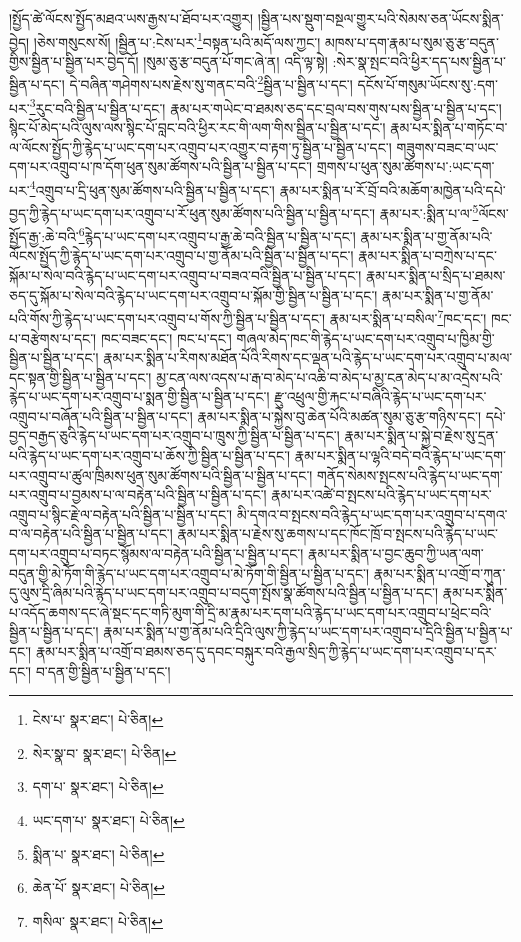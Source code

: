 །སྤྱོད་ཚེ་ལོངས་སྤྱོད་མཐའ་ཡས་རྒྱས་པ་ཐོབ་པར་འགྱུར། །སྦྱིན་པས་སྡུག་བསྔལ་གྱུར་པའི་སེམས་ཅན་ཡོངས་སྨིན་བྱེད། །ཅེས་གསུངས་སོ། །སྦྱིན་པ་:ངེས་པར་\footnote{ངེས་པ་  སྣར་ཐང་།  པེ་ཅིན། }བསྟན་པའི་མདོ་ལས་ཀྱང་། མཁས་པ་དག་རྣམ་པ་སུམ་ཅུ་རྩ་བདུན་གྱིས་སྦྱིན་པ་སྦྱིན་པར་བྱེད་དོ། །སུམ་ཅུ་རྩ་བདུན་པོ་གང་ཞེ་ན། འདི་ལྟ་སྟེ། :སེར་སྣ་སྤང་བའི་ཕྱིར་དད་པས་སྦྱིན་པ་སྦྱིན་པ་དང་། དེ་བཞིན་གཤེགས་པས་རྗེས་སུ་གནང་བའི་\footnote{སེར་སྣ་བ་  སྣར་ཐང་།  པེ་ཅིན། }སྦྱིན་པ་སྦྱིན་པ་དང་། དངོས་པོ་གསུམ་ཡོངས་སུ་:དག་པར་\footnote{དག་པ་  སྣར་ཐང་།  པེ་ཅིན། }རུང་བའི་སྦྱིན་པ་སྦྱིན་པ་དང་། རྣམ་པར་གཡེང་བ་ཐམས་ཅད་དང་བྲལ་བས་གུས་པས་སྦྱིན་པ་སྦྱིན་པ་དང་། སྙིང་པོ་མེད་པའི་ལུས་ལས་སྙིང་པོ་བླང་བའི་ཕྱིར་རང་གི་ལག་གིས་སྦྱིན་པ་སྦྱིན་པ་དང་། རྣམ་པར་སྨིན་པ་གཏོང་བ་ལ་ལོངས་སྤྱོད་ཀྱི་རྙེད་པ་ཡང་དག་པར་འགྲུབ་པར་འགྱུར་བ་རྟག་ཏུ་སྦྱིན་པ་སྦྱིན་པ་དང་། གཟུགས་བཟང་བ་ཡང་དག་པར་འགྲུབ་པ་ཁ་དོག་ཕུན་སུམ་ཚོགས་པའི་སྦྱིན་པ་སྦྱིན་པ་དང་། གྲགས་པ་ཕུན་སུམ་ཚོགས་པ་:ཡང་དག་པར་\footnote{ཡང་དག་པ་  སྣར་ཐང་།  པེ་ཅིན། }འགྲུབ་པ་དྲི་ཕུན་སུམ་ཚོགས་པའི་སྦྱིན་པ་སྦྱིན་པ་དང་། རྣམ་པར་སྨིན་པ་རོ་བྲོ་བའི་མཆོག་མཁྱེན་པའི་དཔེ་བྱད་ཀྱི་རྙེད་པ་ཡང་དག་པར་འགྲུབ་པ་རོ་ཕུན་སུམ་ཚོགས་པའི་སྦྱིན་པ་སྦྱིན་པ་དང་། རྣམ་པར་:སྨིན་པ་ལ་\footnote{སྨིན་པ་  སྣར་ཐང་།  པེ་ཅིན། }ལོངས་སྤྱོད་རྒྱ་:ཆེ་བའི་\footnote{ཆེན་པོ་  སྣར་ཐང་།  པེ་ཅིན། }རྙེད་པ་ཡང་དག་པར་འགྲུབ་པ་རྒྱ་ཆེ་བའི་སྦྱིན་པ་སྦྱིན་པ་དང་། རྣམ་པར་སྨིན་པ་གྱ་ནོམ་པའི་ལོངས་སྤྱོད་ཀྱི་རྙེད་པ་ཡང་དག་པར་འགྲུབ་པ་གྱ་ནོམ་པའི་སྦྱིན་པ་སྦྱིན་པ་དང་། རྣམ་པར་སྨིན་པ་བཀྲེས་པ་དང་སྐོམ་པ་སེལ་བའི་རྙེད་པ་ཡང་དག་པར་འགྲུབ་པ་བཟའ་བའི་སྦྱིན་པ་སྦྱིན་པ་དང་། རྣམ་པར་སྨིན་པ་སྲིད་པ་ཐམས་ཅད་དུ་སྐོམ་པ་སེལ་བའི་རྙེད་པ་ཡང་དག་པར་འགྲུབ་པ་སྐོམ་གྱི་སྦྱིན་པ་སྦྱིན་པ་དང་། རྣམ་པར་སྨིན་པ་གྱ་ནོམ་པའི་གོས་ཀྱི་རྙེད་པ་ཡང་དག་པར་འགྲུབ་པ་གོས་ཀྱི་སྦྱིན་པ་སྦྱིན་པ་དང་། རྣམ་པར་སྨིན་པ་བསིལ་\footnote{གསིལ་  སྣར་ཐང་།  པེ་ཅིན། }ཁང་དང་། ཁང་པ་བརྩེགས་པ་དང་། ཁང་བཟང་དང་། ཁང་པ་དང་། གཞལ་མེད་ཁང་གི་རྙེད་པ་ཡང་དག་པར་འགྲུབ་པ་ཁྱིམ་གྱི་སྦྱིན་པ་སྦྱིན་པ་དང་། རྣམ་པར་སྨིན་པ་རིགས་མཐོན་པོའི་རིགས་དང་ལྡན་པའི་རྙེད་པ་ཡང་དག་པར་འགྲུབ་པ་མལ་དང་སྟན་གྱི་སྦྱིན་པ་སྦྱིན་པ་དང་། མྱ་ངན་ལས་འདས་པ་རྒ་བ་མེད་པ་འཆི་བ་མེད་པ་མྱ་ངན་མེད་པ་མ་འདྲེས་པའི་རྙེད་པ་ཡང་དག་པར་འགྲུབ་པ་སྨན་གྱི་སྦྱིན་པ་སྦྱིན་པ་དང་། རྫུ་འཕྲུལ་གྱི་རྐང་པ་བཞིའི་རྙེད་པ་ཡང་དག་པར་འགྲུབ་པ་བཞོན་པའི་སྦྱིན་པ་སྦྱིན་པ་དང་། རྣམ་པར་སྨིན་པ་སྐྱེས་བུ་ཆེན་པོའི་མཚན་སུམ་ཅུ་རྩ་གཉིས་དང་། དཔེ་བྱད་བརྒྱད་ཅུའི་རྙེད་པ་ཡང་དག་པར་འགྲུབ་པ་ཁྲུས་ཀྱི་སྦྱིན་པ་སྦྱིན་པ་དང་། རྣམ་པར་སྨིན་པ་སྐྱེ་བ་རྗེས་སུ་དྲན་པའི་རྙེད་པ་ཡང་དག་པར་འགྲུབ་པ་ཆོས་ཀྱི་སྦྱིན་པ་སྦྱིན་པ་དང་། རྣམ་པར་སྨིན་པ་ལྷའི་བདེ་བའི་རྙེད་པ་ཡང་དག་པར་འགྲུབ་པ་ཚུལ་ཁྲིམས་ཕུན་སུམ་ཚོགས་པའི་སྦྱིན་པ་སྦྱིན་པ་དང་། གནོད་སེམས་སྤངས་པའི་རྙེད་པ་ཡང་དག་པར་འགྲུབ་པ་བྱམས་པ་ལ་བརྟེན་པའི་སྦྱིན་པ་སྦྱིན་པ་དང་། རྣམ་པར་འཚེ་བ་སྤངས་པའི་རྙེད་པ་ཡང་དག་པར་འགྲུབ་པ་སྙིང་རྗེ་ལ་བརྟེན་པའི་སྦྱིན་པ་སྦྱིན་པ་དང་། མི་དགའ་བ་སྤངས་བའི་རྙེད་པ་ཡང་དག་པར་འགྲུབ་པ་དགའ་བ་ལ་བརྟེན་པའི་སྦྱིན་པ་སྦྱིན་པ་དང་། རྣམ་པར་སྨིན་པ་རྗེས་སུ་ཆགས་པ་དང་ཁོང་ཁྲོ་བ་སྤངས་པའི་རྙེད་པ་ཡང་དག་པར་འགྲུབ་པ་བཏང་སྙོམས་ལ་བརྟེན་པའི་སྦྱིན་པ་སྦྱིན་པ་དང་། རྣམ་པར་སྨིན་པ་བྱང་ཆུབ་ཀྱི་ཡན་ལག་བདུན་གྱི་མེ་ཏོག་གི་རྙེད་པ་ཡང་དག་པར་འགྲུབ་པ་མེ་ཏོག་གི་སྦྱིན་པ་སྦྱིན་པ་དང་། རྣམ་པར་སྨིན་པ་འགྲོ་བ་ཀུན་དུ་ལུས་དྲི་ཞིམ་པའི་རྙེད་པ་ཡང་དག་པར་འགྲུབ་པ་བདུག་སྤོས་སྣ་ཚོགས་པའི་སྦྱིན་པ་སྦྱིན་པ་དང་། རྣམ་པར་སྨིན་པ་འདོད་ཆགས་དང་ཞེ་སྡང་དང་གཏི་མུག་གི་དྲི་མ་རྣམ་པར་དག་པའི་རྙེད་པ་ཡང་དག་པར་འགྲུབ་པ་ཕྲེང་བའི་སྦྱིན་པ་སྦྱིན་པ་དང་། རྣམ་པར་སྨིན་པ་གྱ་ནོམ་པའི་དྲིའི་ལུས་ཀྱི་རྙེད་པ་ཡང་དག་པར་འགྲུབ་པ་དྲིའི་སྦྱིན་པ་སྦྱིན་པ་དང་། རྣམ་པར་སྨིན་པ་འགྲོ་བ་ཐམས་ཅད་དུ་དབང་བསྐུར་བའི་རྒྱལ་སྲིད་ཀྱི་རྙེད་པ་ཡང་དག་པར་འགྲུབ་པ་དར་དང་། བ་དན་གྱི་སྦྱིན་པ་སྦྱིན་པ་དང་། 